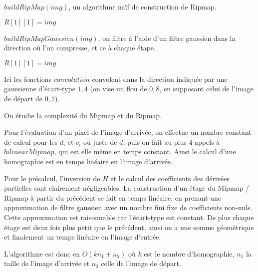 \medbreak
\medbreak
\begin{algorithm}[H]
\caption{$buildRipMap(img)$, un algorithme naïf de construction de Ripmap.}
\label{buildRipmap1}
$R[1][1] = img$\;

\end{algorithm}
\medbreak
\medbreak
\medbreak
\medbreak
\begin{algorithm}[H]
\caption{$buildRipMapGaussien(img)$, on filtre à l'aide d'un filtre gaussien dans la direction où l'on compresse, et ce à chaque étape.}
\label{buildRipmap2}
$R[1][1] = img$\;

\end{algorithm}
\medbreak
\medbreak
Ici les fonctions $convolution$ convolent dans la direction indiquée par une gaussienne d'écart-type $1,4$ \cite{morel2011sift} (on vise un flou de $0,8$, en supposant celui de l'image de départ de $0,7$).


On étudie la complexité du Mipmap et du Ripmap.

Pour l'évaluation d'un pixel de l'image d'arrivée, on effectue un nombre constant de calcul pour les $d_i$ et $c_i$ ou juste de $d$, puis on fait au plus 4 appels à $bilinearMipmap$, qui est elle même en temps constant. Ainsi le calcul d'une homographie est en temps linéaire en l'image d'arrivée.

Pour le précalcul, l'inversion de $H$ et le calcul des coefficients des dérivées partielles sont clairement négligeables. La construction d'un étage du Mipmap / Ripmap à partir du précédent se fait en temps linéaire, en prenant une approximation de filtre gaussien avec un nombre fini fixe de coefficients non-nuls. Cette approximation est raisonnable car l'écart-type est constant. De plus chaque étage est deux fois plus petit que le précédent, ainsi on a une somme géométrique et finalement un temps linéaire en l'image d'entrée.

L'algorithme est donc en $O(k n_1 + n_2)$ où $k$ est le nombre d'homographie, $n_1$ la taille de l'image d'arrivée et $n_2$ celle de l'image de départ.



